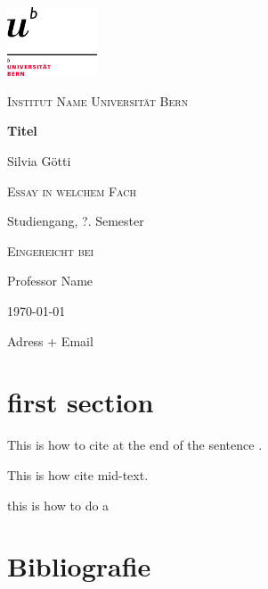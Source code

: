 \documentclass[12pt,a4paper]{article}
\author{Silvia Götti}
\begin{document}
\begin{titlepage}

\centering
	\includegraphics[width=0.2\textwidth]{logo_unibern@2x.png}
	\vfill
	{\scshape\LARGE Institut Name Universität Bern \par}
	\vspace{1cm}	
	{\huge\bfseries Titel\par}
	\vspace{2cm}
	{\Large Silvia Götti\par}	
	\vspace{1cm}
	{\scshape Essay in welchem Fach\par}
	{Studiengang, ?. Semester\par}
	\vspace{1.5cm}
	
	{\scshape Eingereicht bei\par}
	Professor Name

	
	{\today\par}
	\vfill
	Adress + Email


\end{titlepage}

\tableofcontents

\newpage
{}

\section{first section}

This is how to cite at the end of the sentence \citep[S.23]{richter_altsteinzeit_2018}.

This is how \citet{berg_weltkulturerbe_2018} cite mid-text.

this is how to do a 

\newpage

\section{Bibliografie}

%
\renewcommand{\harvardurl}[1]{\url{#1}}

\end{document}
